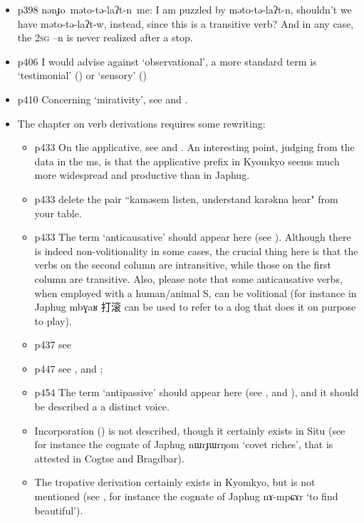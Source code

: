 \documentclass[oldfontcommands,oneside,a4paper,11pt]{article}
\newcommand{\ipa}[1]{{\phon \mbox{#1}}} %
\newcommand{\zh}[1]{{\cn #1}}
\begin{document}
\begin{itemize}
\item p398 \ipa{nənɟo məto-tə-laʔt-n me}: I am puzzled by \ipa{məto-tə-laʔt-n}, shouldn't we have \ipa{məto-tə-laʔt-w}, instead, since this is a transitive verb? And in any case, the \textsc{2sg} \ipa{--n} is never realized after a stop.
\item p406 I would advise against `observational', a more standard term is `testimonial' (\citealt{hill13hdug}) or `sensory' (\citealt{tournadre14evidentiality})
\item p410 Concerning `mirativity', see \citet{hill13hdug} and \citealt{tournadre14evidentiality}.
\item The chapter on verb derivations requires some rewriting:
\begin{itemize}
\item p433 On the applicative, see \citet{jacques13tropative} and \citet{jackson14morpho}. An interesting point, judging from the data in the ms, is that the applicative prefix in Kyomkyo seems much more widespread and productive than in Japhug. 
\item p433 delete the pair ``\ipa{kaməsem} listen, understand \ipa{karəkna} hear" from your table.
\item  p433 The term `anticausative' should appear here (see \citealt{jacques12demotion}). Although there is indeed non-volitionality in some cases, the crucial thing here is that the verbs on the second column are intransitive, while those on the first column are transitive. Also, please note that some anticausative verbs, when employed with a human/animal S, can be volitional (for instance in Japhug \ipa{mbɣaʁ} \zh{打滚}  can be used to refer to a dog that does it on purpose to play).
\item p437 see \citet{jacques10refl}
\item p447 see \citet{jacques07passif}, \citet{jacques12demotion} and \citet{jackson14morpho}; 
\item p454 The  term `antipassive' should appear here (see \citealt{jacques12demotion}, \citet{jacques14antipassive} and \citet{jackson14morpho}), and it should be described a a distinct voice.
\item Incorporation (\citealt{jacques12incorp}) is not described, though it certainly exists in Situ (see for instance the cognate of Japhug \ipa{nɯrɟɯrŋom} `covet riches', that is attested in Cogtse and Bragdbar). 
\item The tropative derivation certainly exists in Kyomkyo, but is not mentioned (see \citealt{jacques13tropative}, for instance the cognate of Japhug \ipa{nɤ-mpɕɤr} `to find beautiful').

\end{itemize}
\end{itemize}
\end{document}

